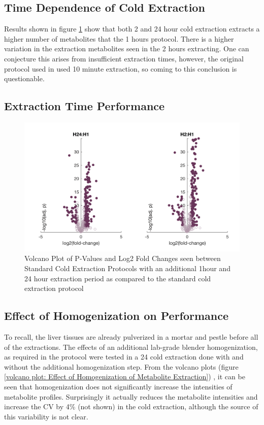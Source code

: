 \documentclass[a4paper,11pt,twoside]{book}
\begin{document}
	\subsection*{Time Dependence of Cold Extraction}
	Results shown in figure \ref{volcano plot: 24h, 1h and 2h cold extraction comparisons} show that  both 2 and 24 hour cold extraction extracts a higher number of metabolites that the 1 hours protocol. There is a higher variation in the extraction metabolites seen in the 2 hours extracting. One can conjecture this arises from insufficient extraction times, however, the original protocol used in \citep{Williams2016SystemsFunction} used 10 minute extraction, so coming to this conclusion is questionable. 
	
	\subsection*{Extraction Time Performance}
	\begin{figure}[htb]
		\centering
		\includegraphics[width=\linewidth]{2.Optimizaiton_Figures/H1-H24-H2-01}
		\caption{Volcano Plot of P-Values and Log2 Fold Changes seen between Standard Cold Extraction Protocols with an additional 1hour and 24 hour extraction period as compared to the standard cold extraction protocol}
		\label{volcano plot: 24h, 1h and 2h cold extraction comparisons}
	\end{figure}
	
	\subsection*{Effect of Homogenization on Performance}
	
	To recall, the liver tissues are already pulverized in a mortar and pestle before all of the extractions. The effects of an additional lab-grade blender homogenization, as required in the \citeauthor{Williams2016SystemsFunction} protocol were tested in a 24 cold extraction done with and without the additional homogenization step. From the volcano plots (figure \ref{volcano plot: Effect of Homogenization of Metabolite Extraction}) , it can be seen that homogenization does not significantly increase the intensities of metabolite profiles. Surprisingly it actually reduces the metabolite intensities and increase the CV by 4\% (not shown) in the cold extraction, although the source of this variability is not clear.
	
\end{document}
